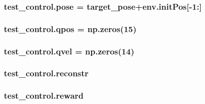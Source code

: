 \subsubsection[{\texorpdfstring{pose}{pose}}]{\setlength{\rightskip}{0pt plus 5cm}test\+\_\+control.\+pose = {\bf target\+\_\+pose}+env.\+init\+Pos\mbox{[}-\/1\+:\mbox{]}}\hypertarget{namespacetest__control_ae91bf3253d8443e730376135c1d71210}{}\label{namespacetest__control_ae91bf3253d8443e730376135c1d71210}
\subsubsection[{\texorpdfstring{qpos}{qpos}}]{\setlength{\rightskip}{0pt plus 5cm}test\+\_\+control.\+qpos = np.\+zeros(15)}\hypertarget{namespacetest__control_af4139c43eec64fc6687c74defc4c4fed}{}\label{namespacetest__control_af4139c43eec64fc6687c74defc4c4fed}
\subsubsection[{\texorpdfstring{qvel}{qvel}}]{\setlength{\rightskip}{0pt plus 5cm}test\+\_\+control.\+qvel = np.\+zeros(14)}\hypertarget{namespacetest__control_acef30ea01ea2a970e96ecf849bedcfc7}{}\label{namespacetest__control_acef30ea01ea2a970e96ecf849bedcfc7}
\subsubsection[{\texorpdfstring{reconstr}{reconstr}}]{\setlength{\rightskip}{0pt plus 5cm}test\+\_\+control.\+reconstr}\hypertarget{namespacetest__control_a362587b14304a2ba01f5dcaf55cd3108}{}\label{namespacetest__control_a362587b14304a2ba01f5dcaf55cd3108}
\subsubsection[{\texorpdfstring{reward}{reward}}]{\setlength{\rightskip}{0pt plus 5cm}test\+\_\+control.\+reward}\hypertarget{namespacetest__control_a15ad2f6cbc524b2b914dfdd11a2b76b6}{}\label{namespacetest__control_a15ad2f6cbc524b2b914dfdd11a2b76b6}
